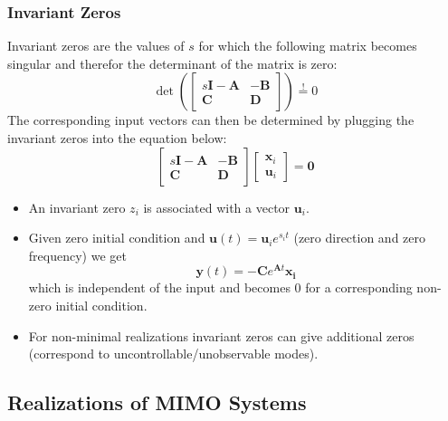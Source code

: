 \subsubsection{Invariant Zeros}

Invariant zeros are the values of $s$ for which the following matrix becomes singular and therefor the determinant of the matrix is zero:
\begin{equation*}
    \det \left(\begin{bmatrix}
            s\mathbf{I}-\mathbf{A} & -\mathbf{B} \\
            \mathbf{C}             & \mathbf{D}
        \end{bmatrix}\right) \overset{!}{=}0
\end{equation*}
The corresponding input vectors can then be determined by plugging the invariant zeros into the equation below:
\begin{equation*}
    \begin{bmatrix}
        s\mathbf{I}-\mathbf{A} & -\mathbf{B} \\
        \mathbf{C}             & \mathbf{D}
    \end{bmatrix}
    \begin{bmatrix}
        \mathbf{x}_i \\
        \mathbf{u}_i
    \end{bmatrix}=\mathbf{0}
\end{equation*}


\begin{itemize}
    \item An invariant zero $z_i$ is associated with a vector $\mathbf{u}_i$.
    \item Given zero initial condition and $\mathbf{u}(t)=\mathbf{u}_i e^{s_i t}$ (zero direction and zero frequency) we get
          \begin{equation*}
              \mathbf{y}(t)=-\mathbf{C}e^{\mathbf{A}t}\mathbf{x_i}
          \end{equation*} which is independent of the input and becomes $0$ for a corresponding non-zero initial condition.
    \item For non-minimal realizations invariant zeros can give additional zeros (correspond to uncontrollable/unobservable modes).
\end{itemize}


\subsection{Realizations of MIMO Systems}
